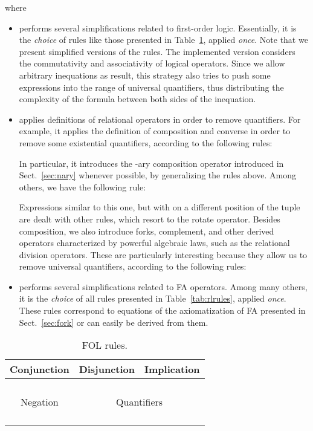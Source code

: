 \documentclass{llncs}
\begin{document}
where
\begin{itemize}
\item  performs several simplifications related to
  first-order logic. Essentially, it is the \emph{choice} of rules like those
  presented in Table~\ref{tab:logicrules}, applied \emph{once}. Note
  that we present simplified versions of the rules. The implemented
  version considers the commutativity and associativity of logical
  operators. Since we allow arbitrary inequations as result, this
  strategy also tries to push some expressions into the range of
  universal quantifiers, thus distributing the complexity of the
  formula between both sides of the inequation.
\item  applies definitions of relational
  operators in order to remove quantifiers. For example, it applies
  the definition of composition and converse in order to remove some
  existential quantifiers, according to the following rules:
  
  In particular, it introduces the -ary composition operator
  introduced in Sect.~\ref{sec:nary} whenever possible, by
  generalizing the rules above. Among others, we have the following
  rule:
  
  Expressions similar to this one, but with  on a different position of the tuple are dealt with other rules, which resort to the rotate operator.
  Besides composition, we also introduce forks, complement, and other
  derived operators characterized by powerful algebraic laws, such as
  the relational division operators. These are particularly
  interesting because they allow us to remove universal quantifiers,
  according to the following rules:
  
\item  performs several simplifications related to
  FA operators. Among many others, it is the \emph{choice} of all
  rules presented in Table~\ref{tab:rlrules}, applied
  \emph{once}. These rules correspond to equations of the
  axiomatization of FA presented in Sect.~\ref{sec:fork} or can
  easily be derived from them.
\end{itemize}

\begin{table}[t]
\center
\begin{tabular}{|c|c|c|}
\hline
Conjunction & Disjunction & Implication  \\
\hline
 &  & \\
 &  &  \\
 &  & \\
 &  &  \\
\hline
Negation &\multicolumn{2}{|c|}{Quantifiers} \\
\hline
 & \multicolumn{2}{|c|}{}\\
 & \multicolumn{2}{|c|}{} \\
 & \multicolumn{2}{|c|}{} \\
& \multicolumn{2}{|c|}{} \\
\hline
\end{tabular}
\caption{FOL rules.}
\label{tab:logicrules}
\end{table} 
\end{document}
